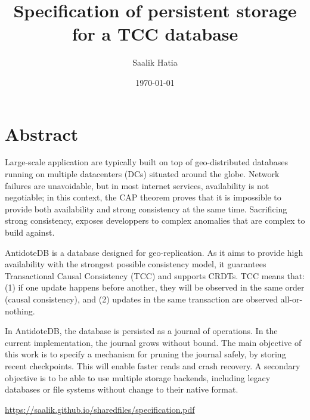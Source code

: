\documentclass[11pt]{article}
\begin{document}
\author{Saalik Hatia}
\title{Specification of persistent storage for a TCC database}
\date\today
\maketitle

\section{Abstract}

Large-scale application are typically built on top of geo-distributed
databases running on multiple datacenters (DCs) situated around the
globe.
Network failures are unavoidable, but in most internet services,
availability is not negotiable; in this context, the CAP theorem proves
that it is impossible to provide both availability and strong
consistency at the same time.
Sacrificing strong consistency, exposes developpers to complex anomalies
that are complex to build against.

AntidoteDB is a database designed for geo-replication.
As it aims to provide high availability with the strongest possible
consistency model, it guarantees Transactional Causal Consistency (TCC)
and supports CRDTs.
TCC means that: (1) if one update happens before another, they will be
observed in the same order (causal consistency), and (2) updates in the
same transaction are observed all-or-nothing.

In AntidoteDB, the database is persisted as a journal of operations.
In the current implementation, the journal grows without bound.
The main objective of this work is to specify a mechanism for
pruning the journal safely, by storing recent checkpoints.
This will enable faster reads and crash recovery.
A secondary objective is to be able to use multiple storage backends,
including legacy databases or file systems without change to their
native format.



\url{https://saalik.github.io/sharedfiles/specification.pdf}
\end{document}
